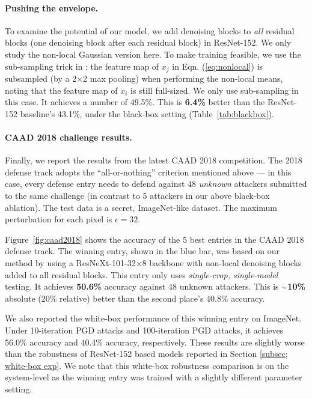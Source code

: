 \documentclass[10pt,twocolumn,letterpaper]{article}
\newcommand{\app}{\raise.17ex\hbox{$\scriptstyle\sim$}}
\begin{document}
\paragraph{Pushing the envelope.} To examine the potential of our model, we add denoising blocks to \emph{all} residual blocks (one denoising block after each residual block) in ResNet-152.
We only study the non-local Gaussian version here. 
To make training feasible, we use the sub-sampling trick in \cite{Wang2018}: the feature map of $x_j$ in Eqn. (\ref{eq:nonlocal}) is subsampled (by a 2$\times$2 max pooling) when performing the non-local means, noting that the feature map of $x_i$ is still full-sized. We only use sub-sampling in this case. It achieves a number of 49.5\%. This is \textbf{6.4\%} better than the ResNet-152 baseline's 43.1\%, under the black-box setting (Table~\ref{tab:blackbox}).

\paragraph{CAAD 2018 challenge results.} Finally, we report the results from the latest CAAD 2018 competition. The 2018 defense track adopts the ``all-or-nothing'' criterion mentioned above --- in this case, every defense entry needs to defend against 48 \emph{unknown} attackers submitted to the same challenge (in contrast to 5 attackers in our above black-box ablation). 
The test data is a secret, ImageNet-like dataset.
The maximum perturbation for each pixel is $\epsilon=32$.

Figure~\ref{fig:caad2018} shows the accuracy of the 5 best entries in the CAAD 2018 defense track. The winning entry, shown in the blue bar, was based on our method by using a ResNeXt-101-32$\times$8 backbone \cite{Xie2017} with non-local denoising blocks added to all residual blocks. This entry only uses \emph{single-crop, single-model} testing. It achieves \textbf{50.6\%} accuracy against 48 unknown attackers. This is $\app$\textbf{10\%} absolute (20\% relative) better than the second place's 40.8\% accuracy. 

We also reported the white-box performance of this winning entry on ImageNet. Under 10-iteration PGD attacks and 100-iteration PGD attacks, it achieves 56.0\% accuracy and 40.4\% accuracy, respectively. These results are slightly worse than the robustness of ResNet-152 based models reported in Section \ref{subsec; white-box exp}. We note that this white-box robustness comparison is on the system-level as the winning entry was trained with a slightly different parameter setting. 
\end{document}
